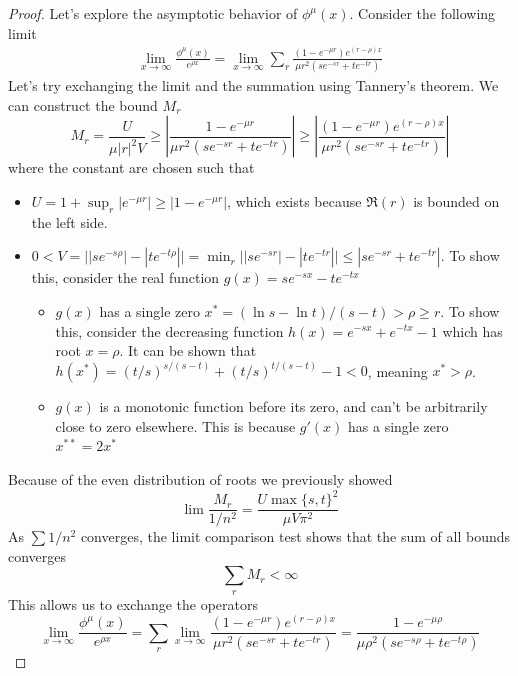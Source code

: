 \documentclass[]{article}
\begin{document}
\begin{proof}
Let's explore the asymptotic behavior of $\phi^{\mu}(x)$. Consider the following limit
\begin{align*}
\lim_{x\to\infty}\frac{\phi^{\mu}(x)}{e^{\rho x}} = \lim_{x\to\infty}\sum_{r} \frac{(1-e^{-\mu r})e^{(r-\rho)x}}{\mu r^2(se^{-sr}+te^{-tr})}
\end{align*}
Let's try exchanging the limit and the summation using Tannery's theorem. We can construct the bound $M_r$ 
\[
M_r = \frac{U}{\mu |r|^2 V}\ge \left| \frac{1-e^{-\mu r}}{\mu r^2(se^{-sr}+te^{-tr})} \right| \ge \left| \frac{(1-e^{-\mu r})e^{(r-\rho)x}}{\mu r^2(se^{-sr}+te^{-tr})} \right|
\]
where the constant are chosen such that
\begin{itemize}
	\item $U = 1 + \sup_{r} |e^{-\mu r}| \ge |1-e^{-\mu r}|$, which exists because $\Re(r)$ is bounded on the left side.
	\item $0 < V =  \big||se^{-s\rho}| - |te^{-t\rho}|\big| = \min_{r} \big||se^{-sr}| - |te^{-tr}|\big| \le |se^{-sr}+te^{-tr}|$. To show this, consider the real function $g(x) = se^{-sx} - te^{-tx}$
	\begin{itemize}
		\item $g(x)$ has a single zero $x^* = (\ln s - \ln t) / (s - t) > \rho \ge r$. To show this, consider the decreasing function $h(x) = e^{-sx} + e^{-tx} - 1$ which has root $x = \rho$. It can be shown that $h(x^*)  =(t/s)^{s/(s-t)} + (t/s)^{t/(s-t)} -1 < 0$, meaning $x^* > \rho$.
		\item $g(x)$ is a monotonic function before its zero, and can't be arbitrarily close to zero elsewhere. This is because $g'(x)$ has a single zero $x^{**} = 2x^*$ 
	\end{itemize}
\end{itemize}
Because of the even distribution of roots we previously showed
\[
	\lim \frac{M_r}{1/n^2} = \frac{U \max\{s,t\}^2}{\mu V \pi^2}
\]
As $\sum 1/n^2$ converges, the limit comparison test shows that the sum of all bounds converges
\[
\sum_{r} M_r < \infty
\]
This allows us to exchange the operators
\[
\lim_{x\to\infty}\frac{\phi^{\mu}(x)}{e^{\rho x}} =\sum_{r}  \lim_{x\to\infty}\frac{(1-e^{-\mu r})e^{(r-\rho)x}}{\mu r^2(se^{-sr}+te^{-tr})} = \frac{1-e^{-\mu \rho}}{\mu \rho^2(se^{-s\rho}+te^{-t\rho})}
\]


\end{proof}
\end{document}
